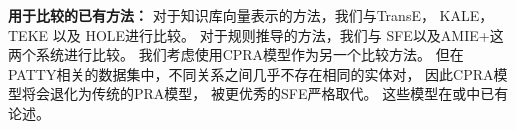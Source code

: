 \textbf{用于比较的已有方法：}
对于知识库向量表示的方法，我们与TransE\cite{bordes2013translating}，
KALE\cite{guo2016jointly}，TEKE \cite{wang2016text}以及
HOLE\cite{nickel2015holographic}进行比较。
%
对于规则推导的方法，我们与
SFE\cite{gardner2015efficient}以及AMIE+\cite{galarraga2015fast}这两个系统进行比较。
我们考虑使用CPRA模型\cite{wang2016knowledge}作为另一个比较方法。
但在PATTY相关的数据集中，不同关系之间几乎不存在相同的实体对，
因此CPRA模型将会退化为传统的PRA模型\cite{lao2011random}，
被更优秀的SFE严格取代。
这些模型在或中已有论述。

